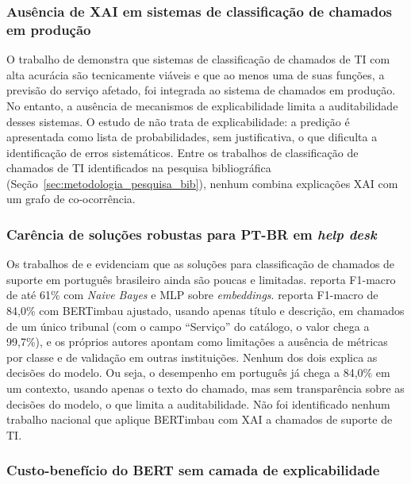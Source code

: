 \documentclass[
    12pt,                %
    openright,           %
    oneside,             %
    a4paper,             %
    english,             %
    brazil               %
]{abntex2}
\begin{document}
\subsubsection{Ausência de XAI em sistemas de classificação de chamados em produção}
\label{subsubsec:lacuna_xai}

O trabalho de  demonstra que sistemas de classificação de chamados de TI com alta acurácia são tecnicamente viáveis e que ao menos uma de suas funções, a previsão do serviço afetado, foi integrada ao sistema de chamados em produção. No entanto, a ausência de mecanismos de explicabilidade limita a auditabilidade desses sistemas. O estudo de  não trata de explicabilidade: a predição é apresentada como lista de probabilidades, sem justificativa, o que dificulta a identificação de erros sistemáticos. Entre os trabalhos de classificação de chamados de TI identificados na pesquisa bibliográfica (Seção~\ref{sec:metodologia_pesquisa_bib}), nenhum combina explicações XAI com um grafo de co-ocorrência.

\subsubsection{Carência de soluções robustas para PT-BR em \textit{help desk}}
\label{subsubsec:lacuna_ptbr}

Os trabalhos de  e  evidenciam que as soluções para classificação de chamados de suporte em português brasileiro ainda são poucas e limitadas.  reporta F1-macro de até 61\% com \textit{Naive Bayes} e MLP sobre \textit{embeddings}.  reporta F1-macro de 84,0\% com BERTimbau ajustado, usando apenas título e descrição, em chamados de um único tribunal (com o campo ``Serviço'' do catálogo, o valor chega a 99,7\%), e os próprios autores apontam como limitações a ausência de métricas por classe e de validação em outras instituições. Nenhum dos dois explica as decisões do modelo. Ou seja, o desempenho em português já chega a 84,0\% em um contexto, usando apenas o texto do chamado, mas sem transparência sobre as decisões do modelo, o que limita a auditabilidade. Não foi identificado nenhum trabalho nacional que aplique BERTimbau com XAI a chamados de suporte de TI.

\subsubsection{Custo-benefício do BERT sem camada de explicabilidade}
\label{subsubsec:lacuna_wahba}
\end{document}
